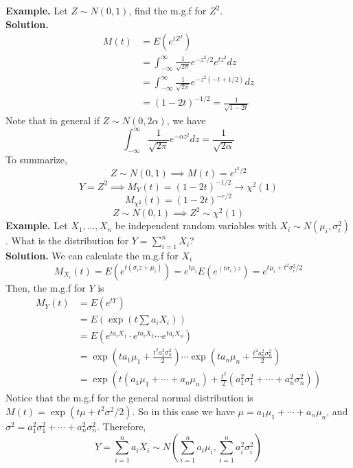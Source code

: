 \noindent
\textbf{Example.} Let $Z \sim N(0,1)$, find the m.g.f for $Z^2$. \\[2ex]
\textbf{Solution.}
\begin{align*}
    M(t) &= E(e^{tZ^2})\\
    &= \int_{-\infty}^\infty \frac{1}{\sqrt{2\pi}}e^{-z^2/2}e^{tz^2}dz\\
    &= \int_{-\infty}^\infty \frac{1}{\sqrt{2\pi}}e^{-z^2(-t + 1/2)}dz\\
    &= (1-2t)^{-1/2} = \frac{1}{\sqrt{1-2t}}
\end{align*}
Note that in general if $Z \sim N(0, 2\alpha)$, we have 
\[\int_{-\infty}^\infty \frac{1}{\sqrt{2\pi}}e^{-\alpha z^2}dz = \frac{1}{\sqrt{2\alpha}}\]
To summarize,
\[Z \sim N(0,1) \implies M(t) = e^{t^2/2}\]
\[Y = Z^2 \implies M_Y(t) = (1-2t)^{-1/2} \rightarrow \chi^2(1)\]
\[M_{\chi^2}(t) = (1-2t)^{-r/2}\]
\[Z \sim N(0,1) \implies Z^2 \sim \chi^2(1)\]
\noindent
\textbf{Example.}
Let $X_1, \ldots, X_n$ be independent random variables with $X_i \sim N(\mu_i, \sigma_i^2)$. What is the distribution for $Y = \sum\limits_{i=1}^n X_i$?\\[2ex]
\textbf{Solution.} 
We can calculate the m.g.f for $X_i$ 
\[M_{X_i}(t) = E(e^{t(\sigma_i z + \mu_i)}) = e^{t\mu_i} E(e^{(t\sigma_i)z}) = e^{t\mu_i + t^2\sigma_i^2/2} \]
Then, the m.g.f for $Y$ is
\begin{align*}
    M_Y(t) &= E(e^{tY})\\
    &= E \left(\exp\left(t\sum a_iX_i\right)\right)\\
    &= E(e^{ta_iX_1} \cdot e^{ta_iX_2} \cdots e^{ta_iX_n})\tag{Independence}\\
    &= \exp\left(ta_1\mu_1 + \frac{t^2a_1^2\sigma_n^2}{2}\right) \cdots \exp\left(ta_n\mu_n + \frac{t^2a_n^2\sigma_n^2}{2}\right)\\
    &= \exp\left(t(a_1\mu_1 + \cdots + a_n\mu_n) + \frac{t^2}{2}(a_1^2\sigma_1^2 + \cdots + a_n^2\sigma_n^2)\right)
\end{align*}
Notice that the m.g.f for the general normal distribution is $M(t) = \exp(t\mu + t^2\sigma^2/2)$. So in this case we have $\mu = a_1\mu_1 + \cdots + a_n\mu_n$, and $\sigma^2 = a_1^2\sigma_1^2 + \cdots + a_n^2\sigma_n^2$. Therefore, 
\[Y = \sum_{i=1}^n a_iX_i \sim N\left(\sum_{i=1}^n a_i\mu_i, \sum_{i=1}^n a_i^2\sigma_i^2\right)\]
